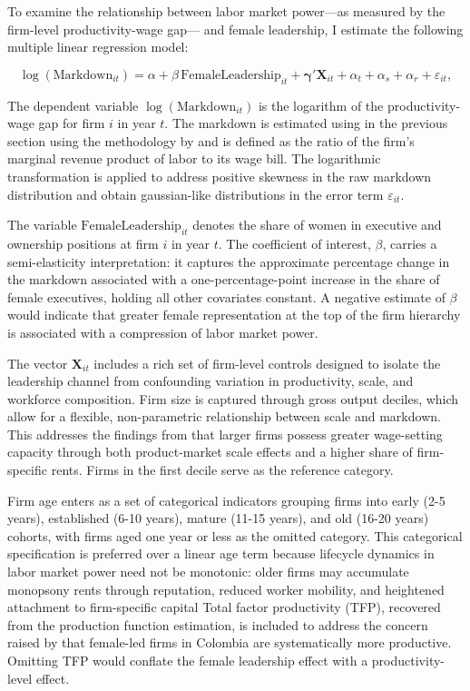 \documentclass[12pt]{article}
\begin{document}
To examine the relationship between labor market power—as measured by the firm-level productivity-wage gap— and female leadership, I estimate the following multiple linear regression model:

\begin{equation}
    \log(\text{Markdown}_{it}) = \alpha + \beta \, \text{FemaleLeadership}_{it} + \boldsymbol{\gamma}' \mathbf{X}_{it} + \alpha_t + \alpha_s + \alpha_r + \varepsilon_{it},
\label{eq:main}
\end{equation}

The dependent variable $\log(\text{Markdown}_{it})$ is the logarithm of the productivity-wage gap for firm $i$ in year $t$. The markdown is estimated using in the previous section using the methodology by \textcite{yeh_monopsony_2022} and is defined as the ratio of the firm's marginal revenue product of labor to its wage bill. The logarithmic transformation is applied to address positive skewness in the raw markdown distribution and obtain gaussian-like distributions in the error term $\varepsilon_{it}$. 

The variable $\text{FemaleLeadership}_{it}$ denotes the share of women in executive and ownership positions at firm $i$ in year $t$. The coefficient of interest, \textbf{$\beta$}, carries a semi-elasticity interpretation: it captures the approximate percentage change in the markdown associated with a one-percentage-point increase in the share of female executives, holding all other covariates constant. A negative estimate of $\beta$ would indicate that greater female representation at the top of the firm hierarchy is associated with a compression of labor market power.

The vector $\mathbf{X}_{it}$ includes a rich set of firm-level controls designed to isolate the leadership channel from confounding variation in productivity, scale, and workforce composition. Firm size is captured through gross output deciles, which allow for a flexible, non-parametric relationship between scale and markdown. This addresses the findings from \textcite{yeh_monopsony_2022} that larger firms possess greater wage-setting capacity through both product-market scale effects and a higher share of firm-specific rents. Firms in the first decile serve as the reference category. 

Firm age enters as a set of categorical indicators grouping firms into early (2-5 years), established (6-10 years), mature (11-15 years), and old (16-20 years) cohorts, with firms aged one year or less as the omitted category. This categorical specification is preferred over a linear age term because lifecycle dynamics in labor market power need not be monotonic: older firms may accumulate monopsony rents through reputation, reduced worker mobility, and heightened attachment to firm-specific capital  Total factor productivity (TFP), recovered from the production function estimation, is included to address the concern raised by \textcite{moreno-gomez_relationship_2018} that female-led firms in Colombia are systematically more productive. Omitting TFP would conflate the female leadership effect with a productivity-level effect.
\end{document}
